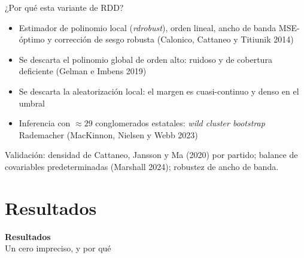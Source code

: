 \documentclass[
  aspectratio=43,        %
  t,                     %
  10pt                   %
]{beamer}
\begin{document}
\begin{frame}{¿Por qué esta variante de RDD?}

  \begin{itemize}
    \item Estimador de polinomio local (\emph{rdrobust}), orden lineal, ancho de
          banda MSE-óptimo y corrección de sesgo robusta (Calonico, Cattaneo y
          Titiunik 2014)
    \item Se descarta el polinomio global de orden alto: ruidoso y de cobertura
          deficiente (Gelman e Imbens 2019)
    \item Se descarta la aleatorización local: el margen es cuasi-continuo y
          denso en el umbral
    \item Inferencia con \textcolor{ITAMgreen}{$\approx 29$ conglomerados}
          estatales: \emph{wild cluster bootstrap} Rademacher (MacKinnon,
          Nielsen y Webb 2023)
  \end{itemize}

  \vspace{0.3em}
  {\footnotesize \textcolor{ITAMgray}{%
    Validación: densidad de Cattaneo, Jansson y Ma (2020) por partido; balance
    de covariables predeterminadas (Marshall 2024); robustez de ancho de banda.}}

\end{frame}

\section{Resultados}
{
\begin{frame}
  \vfill
  \begin{center}
    \textcolor{ITAMgreen}{\Large\bfseries Resultados}\\[0.5em]
    \textcolor{ITAMgray}{\normalsize Un cero impreciso, y por qué}
  \end{center}
  \vfill
\end{frame}
}
\end{document}
